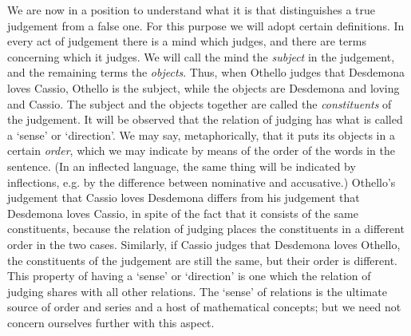 \documentclass[oneside,letterpaper,12pt]{book}
\begin{document}
We are now in a position to understand what it is that distinguishes a
true judgement from a false one. For this purpose we will adopt certain
definitions. In every act of judgement there is a mind which judges, and
there are terms concerning which it judges. We will call the mind the
\emph{subject} in the judgement, and the remaining terms the
\emph{objects}. Thus, when Othello judges that Desdemona loves Cassio,
Othello is the subject, while the objects are Desdemona and loving and
Cassio. The subject and the objects together are called the
\emph{constituents} of the judgement. It will be observed that the
relation of judging has what is called a
`sense' or
`direction'. We may say, metaphorically,
that it puts its objects in a certain \emph{order}, which we may
indicate by means of the order of the words in the sentence. (In an
inflected language, the same thing will be indicated by inflections,
e.g. by the difference between nominative and accusative.)
Othello's judgement that Cassio loves Desdemona differs
from his judgement that Desdemona loves Cassio, in spite of the fact
that it consists of the same constituents, because the relation of
judging places the constituents in a different order in the two cases.
Similarly, if Cassio judges that Desdemona loves Othello, the
constituents of the judgement are still the same, but their order is
different. This property of having a
`sense' or
`direction' is one which the relation
of judging shares with all other relations. The
`sense' of relations is the ultimate
source of order and series and a host of mathematical concepts; but we
need not concern ourselves further with this aspect.
\end{document}
